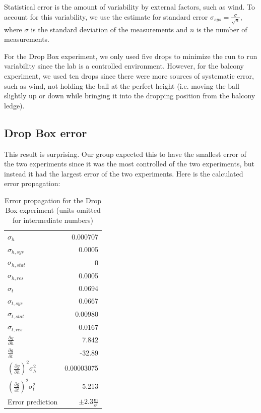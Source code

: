 \documentclass[12pt]{article}
\begin{document}
Statistical error is the amount of variability by external factors, such as wind. To account for this variability, we use the estimate for standard error \(\sigma_{sys} = \frac{\sigma}{\sqrt{n}}\), where \(\sigma\) is the standard deviation of the measurements and \(n\) is the number of measurements.

For the Drop Box experiment, we only used five drops to minimize the run to run variability since the lab is a controlled environment. However, for the balcony experiment, we used ten drops since there were more sources of systematic error, such as wind, not holding the ball at the perfect height (i.e. moving the ball slightly up or down while bringing it into the dropping position from the balcony ledge).
\subsection{Drop Box error}
\label{sec:org4dddd9b}

This result is surprising. Our group expected this to have the smallest error of the two experiments since it was the most controlled of the two experiments, but instead it had the largest error of the two experiments. Here is the calculated error propagation:

\begin{table}[htbp]
\caption{\label{dropbox-error}Error propagation for the Drop Box experiment (units omitted for intermediate numbers)}
\centering
\begin{tabular}{l|r}
\hline
\(\sigma_h\) & 0.000707\\
\(\sigma_{h,sys}\) & 0.0005\\
\(\sigma_{h,stat}\) & 0\\
\(\sigma_{h,res}\) & 0.0005\\
\hline
\(\sigma_t\) & 0.0694\\
\(\sigma_{t,sys}\) & 0.0667\\
\(\sigma_{t,stat}\) & 0.00980\\
\(\sigma_{t,res}\) & 0.0167\\
\hline
\(\frac{\partial g}{\partial h}\) & 7.842\\
\(\frac{\partial g}{\partial t}\) & -32.89\\
\hline
\(\left(\frac{\partial g}{\partial h}\right)^{2}\sigma_{h}^2\) & 0.00003075\\
\(\left(\frac{\partial g}{\partial t}\right)^{2}\sigma_{t}^2\) & 5.213\\
\hline
Error prediction & \(\pm 2.3 \frac{\text{m}}{\text{s}^{2}}\)\\
\end{tabular}
\end{table}
\end{document}
